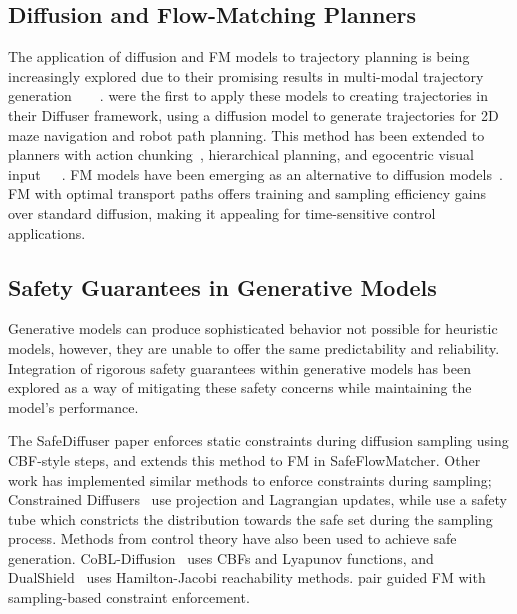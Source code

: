 \subsection{Diffusion and Flow-Matching Planners}

The application of diffusion and FM models to trajectory planning is being increasingly explored due to their promising results in multi-modal trajectory generation~\cite{chi_diffusion_2023}~\cite{navDP_2025}~\cite{NoMaD_2024}~\cite{fan_diffusion_2025}. \citeauthor{janner_planning_2022} were the first to apply these models to creating trajectories in their Diffuser framework, using a diffusion model to generate trajectories for 2D maze navigation and robot path planning. This method has been extended to planners with action chunking~\cite{chi_diffusion_2023}, hierarchical planning, and egocentric visual input~\cite{NoMaD_2024}~\cite{shah_vint_2023}~\cite{navDP_2025}. 
FM models have been emerging as an alternative to diffusion models~\cite{lipman_flowmatching_2022}. FM with optimal transport paths offers training and sampling efficiency gains over standard diffusion, making it appealing for time-sensitive control applications.

\subsection{Safety Guarantees in Generative Models}

Generative models can produce sophisticated behavior not possible for heuristic models, however, they are unable to offer the same predictability and reliability. Integration of rigorous safety guarantees within generative models has been explored as a way of mitigating these safety concerns while maintaining the model's performance. 

The SafeDiffuser paper \cite{xiao_safediffuser_2023} enforces static constraints during diffusion sampling using CBF-style steps, and \citeauthor{yang_safeflowmatcher_2025} extends this method to FM in SafeFlowMatcher. Other work has implemented similar methods to enforce constraints during sampling; Constrained Diffusers~\cite{zhang_constrained_2026} use projection and Lagrangian updates, while \citeauthor{gadginmath_constricting-cbf_2026} use a safety tube which constricts the distribution towards the safe set during the sampling process. Methods from control theory have also been used to achieve safe generation. CoBL-Diffusion~\cite{mizuta_cobl-diffusion_2024} uses CBFs and Lyapunov functions, and DualShield~\cite{yang_dualshield_2026} uses Hamilton-Jacobi reachability methods. \citeauthor{mizuta_unified_2025} pair guided FM with sampling-based constraint enforcement.

